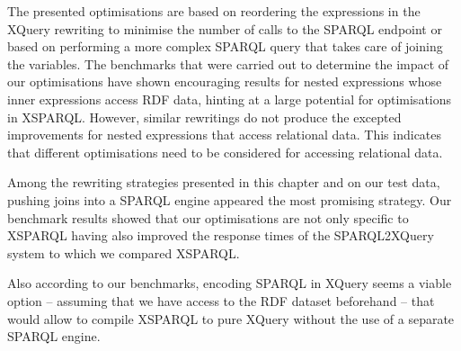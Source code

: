 %
The presented optimisations are based on reordering the expressions in the XQuery rewriting to minimise the number of
calls to the SPARQL endpoint or based on performing a more complex SPARQL query that takes care of joining the
variables.
%
The benchmarks that were carried out to determine the impact of our optimisations have shown encouraging results for
nested expressions whose inner expressions access \ac{RDF} data, hinting at a large potential for optimisations in
XSPARQL.
%
However, similar rewritings do not produce the excepted improvements for nested expressions that access relational
data.   This indicates that different optimisations need to be considered for accessing relational data.

Among the rewriting strategies presented in this chapter and on our test data, pushing joins into a SPARQL engine appeared
the most promising strategy.
%
Our benchmark results showed that our optimisations are not only specific to XSPARQL having also improved the response
times of the SPARQL2XQuery system to which we compared XSPARQL.

%
Also according to our benchmarks, encoding SPARQL in XQuery seems a viable option -- assuming that we have access to the
\ac{RDF} dataset beforehand -- that would allow to compile XSPARQL to pure XQuery without the use of a separate SPARQL
engine.




